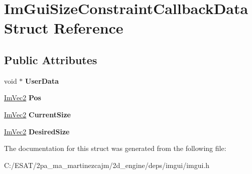 \hypertarget{struct_im_gui_size_constraint_callback_data}{}\section{Im\+Gui\+Size\+Constraint\+Callback\+Data Struct Reference}
\label{struct_im_gui_size_constraint_callback_data}
\subsection*{Public Attributes}
\begin{DoxyCompactItemize}
\item 
\mbox{\label{struct_im_gui_size_constraint_callback_data_a3b2fb1bd849f82edc78377f361433eac}} 
void $\ast$ {\bfseries User\+Data}
\item 
\mbox{\label{struct_im_gui_size_constraint_callback_data_ad3d81153905b00e6d513af4478d82cfd}} 
\hyperlink{struct_im_vec2}{Im\+Vec2} {\bfseries Pos}
\item 
\mbox{\label{struct_im_gui_size_constraint_callback_data_ac7d5013d841044f410cba69344bdb4a1}} 
\hyperlink{struct_im_vec2}{Im\+Vec2} {\bfseries Current\+Size}
\item 
\mbox{\label{struct_im_gui_size_constraint_callback_data_a1080a748a1769de07c5ae1e98de99ea3}} 
\hyperlink{struct_im_vec2}{Im\+Vec2} {\bfseries Desired\+Size}
\end{DoxyCompactItemize}


The documentation for this struct was generated from the following file\+:\begin{DoxyCompactItemize}
\item 
C\+:/\+E\+S\+A\+T/2pa\+\_\+ma\+\_\+martinezcajm/2d\+\_\+engine/deps/imgui/imgui.\+h\end{DoxyCompactItemize}
